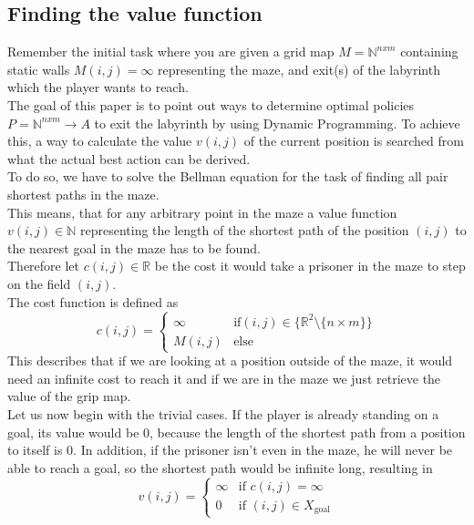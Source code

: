 \documentclass[conference]{IEEEtran}
\begin{document}
\subsection{Finding the value function}
Remember the initial task where you are given a grid map $M=\mathbb{N}^{nxm}$ containing static walls $M(i,j)=\infty$ representing the maze, and exit(s) of the labyrinth which the player wants to reach.\\
The goal of this paper is to point out ways to determine optimal policies $P=\mathbb{N}^{nxm}\rightarrow A$ to exit the labyrinth by using Dynamic Programming. To achieve this, a way to calculate the value $v(i,j)$ of the current position is searched from what the actual best action can be derived.\\
To do so, we have to solve the Bellman equation for the task of finding all pair shortest paths in the maze.\\
This means, that for any arbitrary point in the maze a value function $v(i,j)\in \mathbb{N}$
representing the length of the shortest path of the position $(i, j)$ to the nearest goal in the maze has to be found.\\
Therefore let $c(i,j) \in \mathbb{R}$ be the cost it would take a prisoner in the maze to step on the field $(i,j)$.\\
The cost function is defined as
\begin{equation}
c(i,j) = 
\begin{cases}
	\infty & \text{if} (i,j) \in \{ \mathbb{R}^2 \setminus \{n \times m\}\}\\
	M(i,j) & \text{else}
	\end{cases}
\end{equation}
This describes that if we are looking at a position outside of the maze, it would need an infinite cost to reach it and if we are in the maze we just retrieve the value of the grip map. \\
Let us now begin with the trivial cases.
If the player is already standing on a goal, its value would be $0$, because the length of the shortest path from a position to itself is $0$.
In addition, if the prisoner isn't even in the maze, he will never be able to reach a goal, so the shortest path would be infinite long, resulting in
\begin{equation}
v(i,j) = 
  \begin{cases}	
	\infty & \text{if } c(i,j) = \infty \\
	0 & \text{if } (i,j) \in X_\text{goal}
  \end{cases}
\end{equation}
\end{document}
